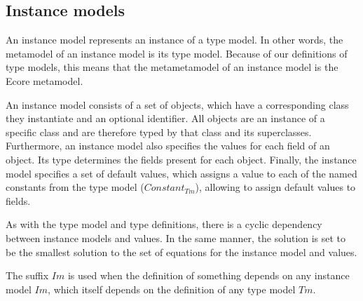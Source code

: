 \subsection{Instance models}
\label{subsec:formalisations:ecore_formalisation:instance_models}
An instance model represents an instance of a type model. In other words, the metamodel of an instance model is its type model. Because of our definitions of type models, this means that the metametamodel of an instance model is the Ecore metamodel.

An instance model consists of a set of objects, which have a corresponding class they instantiate and an optional identifier. All objects are an instance of a specific class and are therefore typed by that class and its superclasses. Furthermore, an instance model also specifies the values for each field of an object. Its type determines the fields present for each object. Finally, the instance model specifies a set of default values, which assigns a value to each of the named constants from the type model ($Constant_{Tm}$), allowing to assign default values to fields.

As with the type model and type definitions, there is a cyclic dependency between instance models and values. In the same manner, the solution is set to be the smallest solution to the set of equations for the instance model and values.

The suffix $Im$ is used when the definition of something depends on any instance model $Im$, which itself depends on the definition of any type model $Tm$.

